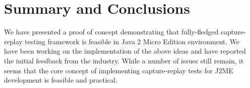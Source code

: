 \documentclass[a4paper,10pt,oneside,final]{dweiss-technote}
\renewcommand{\textsc}[1]{{\scriptsize \MakeUppercase{#1}}}
\newcommand{\jme}{\textsc{j2me}}
\begin{document}


\section{Summary and Conclusions}

We have presented a proof of concept demonstrating that fully-fledged capture-replay testing framework
is feasible in Java 2 Micro Edition environment. We have been working on the implementation of the above
ideas and have reported the initial feedback from the industry. While a number of issues still remain,
it seems that the core concept of implementing capture-replay tests for \jme{} development is feasible
and practical.

\raggedright


\end{document}
